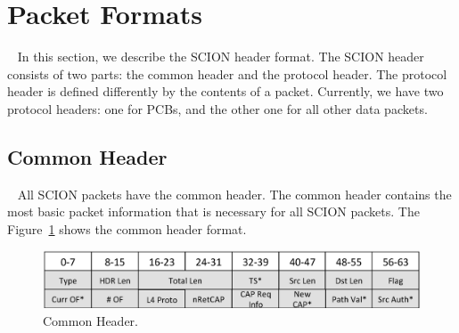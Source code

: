 \section{Packet Formats}~\label{sec:packet-format}
In this section, we describe the SCION header format. The SCION header consists of two parts: the common header and the protocol header. 
The protocol header is defined differently by the contents of a packet. Currently, we have two protocol headers: one for PCBs, and the other one for all other data packets.


\subsection{Common Header}~\label{subsec:common-header}
All SCION packets have the common header. The common header contains the most basic packet information that is necessary for all SCION packets. The Figure~\ref{fig:hdr-common} shows the common header format.

\begin{figure}[ht]
\centering
\includegraphics[width=.9\columnwidth]{./fig/nhdr_common.eps}
\caption{Common Header.}\label{fig:hdr-common}
\end{figure}

